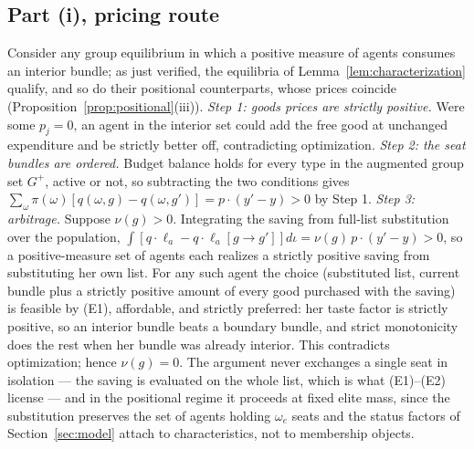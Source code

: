 \documentclass[12pt,letterpaper]{article}
\theoremstyle{definition}
\begin{document}
\subsection{Part (i), pricing route}
Consider any group equilibrium in which a positive measure of agents consumes an interior bundle; as just verified, the equilibria of Lemma~\ref{lem:characterization} qualify, and so do their positional counterparts, whose prices coincide (Proposition~\ref{prop:positional}(iii)).
\emph{Step 1: goods prices are strictly positive.}
Were some $p_j=0$, an agent in the interior set could add the free good at unchanged expenditure and be strictly better off, contradicting optimization.
\emph{Step 2: the seat bundles are ordered.}
Budget balance holds for every type in the augmented group set $G^+$, active or not, so subtracting the two conditions gives $\sum_{\omega}\pi(\omega)\left[q(\omega,g)-q(\omega,g')\right] = p\cdot(y'-y) > 0$ by Step 1.
\emph{Step 3: arbitrage.}
Suppose $\nu(g)>0$.
Integrating the saving from full-list substitution over the population, $\int \left[q\cdot\ell_a - q\cdot\ell_a[g\rightarrow g']\right]d\iota = \nu(g)\,p\cdot(y'-y)>0$, so a positive-measure set of agents each realizes a strictly positive saving from substituting her own list.
For any such agent the choice (substituted list, current bundle plus a strictly positive amount of every good purchased with the saving) is feasible by (E1), affordable, and strictly preferred: her taste factor is strictly positive, so an interior bundle beats a boundary bundle, and strict monotonicity does the rest when her bundle was already interior.
This contradicts optimization; hence $\nu(g)=0$.
The argument never exchanges a single seat in isolation --- the saving is evaluated on the whole list, which is what (E1)--(E2) license --- and in the positional regime it proceeds at fixed elite mass, since the substitution preserves the set of agents holding $\omega_e$ seats and the status factors of Section~\ref{sec:model} attach to characteristics, not to membership objects.
\end{document}
